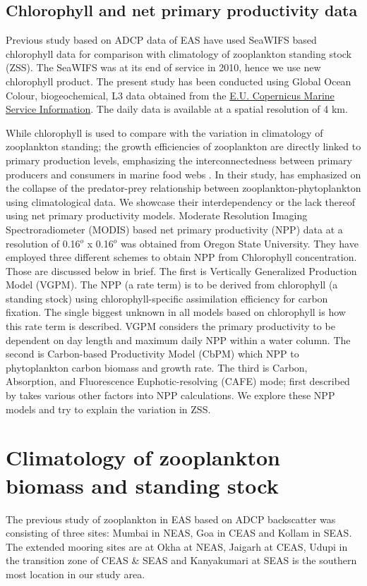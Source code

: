 \documentclass{article}
\begin{document}
	\subsection{Chlorophyll and net primary productivity data}
	Previous study based on ADCP data of EAS \citep{aparna2022seasonal} have used SeaWIFS based chlorophyll data for comparison with climatology of zooplankton standing stock (ZSS). The SeaWIFS was at its end of service in 2010, hence we use new chlorophyll product. The present study has been conducted using Global Ocean Colour, biogeochemical, L3 data obtained from the  \href{https://doi.org/10.48670/moi-00280}{E.U. Copernicus Marine Service Information}. The daily data is available at a spatial resolution of 4 km. 

	While chlorophyll is used to compare with the variation in climatology of zooplankton standing; the growth efficiencies of zooplankton are directly linked to primary production levels, emphasizing the interconnectedness between primary producers and consumers in marine food webs \citep{Friedland.2012}. In their study, \citep{aparna2022seasonal} has emphasized on the collapse of the predator-prey relationship between zooplankton-phytoplankton using climatological data. We showcase their interdependency or the lack thereof using net primary productivity models.
	Moderate Resolution Imaging Spectroradiometer (MODIS) based net primary productivity (NPP) data at a resolution of 0.16$^o$ x 0.16$^o$ was obtained from Oregon State University. They have employed three different schemes to obtain NPP from Chlorophyll concentration. Those are discussed below in brief. The first is Vertically Generalized Production Model (VGPM). The NPP (a rate term) is to be derived from chlorophyll (a standing stock) using chlorophyll-specific assimilation efficiency for carbon fixation. The single biggest unknown in all models based on chlorophyll is how this rate term is described. VGPM considers the primary productivity to be dependent on day length and maximum daily NPP within a water column. The second is Carbon-based Productivity Model (CbPM) which NPP to phytoplankton carbon biomass and growth rate. The third is Carbon, Absorption, and Fluorescence Euphotic-resolving (CAFE) mode; first described by \citep{silsbe2016cafe} takes various other factors into NPP calculations. We explore these NPP models and try to explain the variation in ZSS.
	 
	\section{Climatology of zooplankton biomass and standing stock}
	The previous study of zooplankton in EAS based on ADCP backscatter was consisting of three sites: Mumbai in NEAS, Goa in CEAS and Kollam in SEAS. The extended mooring sites are at Okha at NEAS, Jaigarh at CEAS, Udupi in the transition zone of CEAS \& SEAS and Kanyakumari at SEAS is the southern most location in our study area. 
\end{document}
